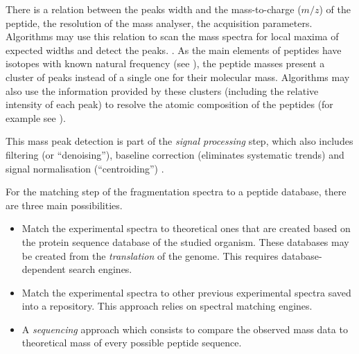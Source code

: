 There is a relation between the peaks width and the mass-to-charge ($m/z$) of
the peptide, the resolution of the mass analyser, the acquisition parameters.
Algorithms may use this relation to scan the mass spectra for local maxima of
expected widths and detect the peaks. .
As the main elements of peptides have isotopes with known natural frequency
(see ), the peptide masses present a cluster of peaks instead
of a single one for their molecular mass. Algorithms may also use the information
provided by these clusters (including the relative intensity of each peak) to
resolve the atomic composition of the peptides (for example see ).

This mass peak detection is part of the \emph{signal processing} step, which also
includes filtering (or \enquote{denoising}), baseline correction (eliminates
systematic trends) and signal normalisation (\enquote{centroiding})
.


For the matching step of the fragmentation spectra to a peptide database,
there are three main possibilities.
\begin{itemize}
    \item Match the experimental spectra to theoretical ones that are created
         based on the protein sequence database of the studied
        organism. These databases may be created from the \emph{
        translation} of the genome. This requires database-dependent search engines.
    \item Match the experimental spectra to other previous experimental spectra
        saved into a repository. This approach relies on spectral matching engines.
    \item A  \emph{sequencing} approach which consists to compare
        the observed mass data to theoretical mass of every possible peptide
        sequence.
\end{itemize}

\label{seg:moreAlgoisbetter}


